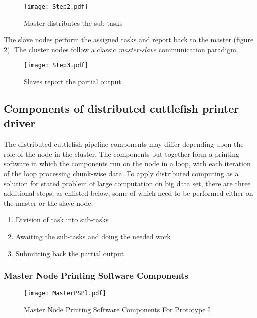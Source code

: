\begin{figure}[ht!]
\centering
\texttt{[image: Step2.pdf]}
\caption{Master distributes the sub-tasks}
\label{fig:Step2}
\end{figure}

The slave nodes perform the assigned tasks and report back to the master (figure \ref{fig:Step3}). The cluster nodes follow a classic \textit{master-slave} communication paradigm. 

\begin{figure}[ht!]
\centering
\texttt{[image: Step3.pdf]}
\caption{Slaves report the partial output}
\label{fig:Step3}
\end{figure}

\subsection{Components of distributed cuttlefish printer driver} \label{DSCuttlefish}

The distributed cuttlefish pipeline components may differ depending upon the role of the node in the cluster. The components put together form a printing software in which the components run on the node in a loop, with each iteration of the loop processing chunk-wise data. To apply distributed computing as a solution for stated problem of large computation on big data set, there are three additional steps, as enlisted below, some of which need to be performed either on the master or the slave node:  
\begin{enumerate}
\item Division of task into sub-tasks 
\item Awaiting the sub-tasks and doing the needed work
\item Submitting back the partial output
\end{enumerate}

\subsubsection{Master Node Printing Software Components}

\begin{figure}[t]
\centering
\texttt{[image: MasterPSPl.pdf]}
\caption{Master Node Printing Software Components For Prototype I}
\label{fig:MasterPS}
\end{figure}

